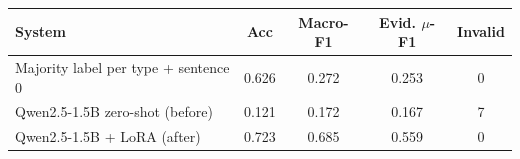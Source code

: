 \begin{tabular}{lcccc}\toprule System & Acc & Macro-F1 & Evid. $\mu$-F1 & Invalid\\\midrule
Majority label per type + sentence 0 & 0.626 & 0.272 & 0.253 & 0\\
Qwen2.5-1.5B zero-shot (before) & 0.121 & 0.172 & 0.167 & 7\\
Qwen2.5-1.5B + LoRA (after) & 0.723 & 0.685 & 0.559 & 0\\
\bottomrule\end{tabular}